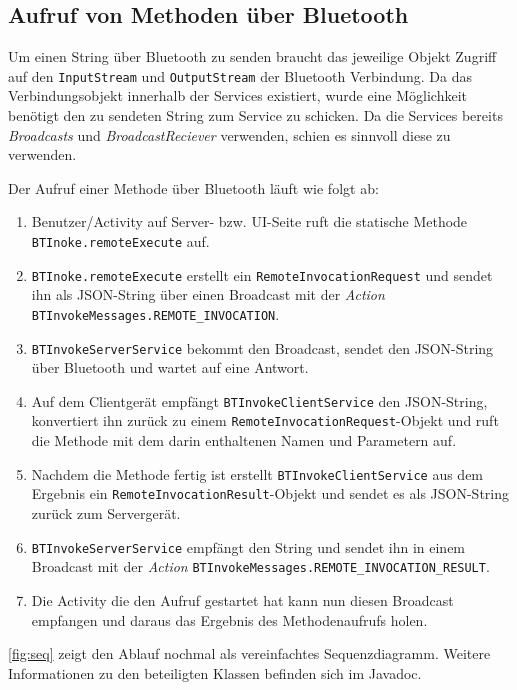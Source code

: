\subsection{Aufruf von Methoden über Bluetooth}
%
Um einen String über Bluetooth zu senden braucht das jeweilige Objekt Zugriff auf den \lstinline{InputStream} und \lstinline{OutputStream} der Bluetooth Verbindung. Da das Verbindungsobjekt innerhalb der Services existiert, wurde eine Möglichkeit benötigt den zu sendeten String zum Service zu schicken. Da die Services bereits \emph{Broadcasts} und \emph{BroadcastReciever} verwenden, schien es sinnvoll diese zu verwenden.

Der Aufruf einer Methode über Bluetooth läuft wie folgt ab:
\begin{enumerate}
  \item Benutzer/Activity auf Server- bzw. UI-Seite ruft die statische Methode \lstinline{BTInoke.remoteExecute} auf.
  \item \lstinline{BTInoke.remoteExecute} erstellt ein \lstinline{RemoteInvocationRequest} und sendet ihn als JSON-String über einen Broadcast mit der \emph{Action} \lstinline{BTInvokeMessages.REMOTE_INVOCATION}.
  \item \lstinline{BTInvokeServerService} bekommt den Broadcast, sendet den JSON-String über Bluetooth und wartet auf eine Antwort.
  \item Auf dem Clientgerät empfängt \lstinline{BTInvokeClientService} den JSON-String, konvertiert ihn zurück zu einem \lstinline{RemoteInvocationRequest}-Objekt und ruft die Methode mit dem darin enthaltenen Namen und Parametern auf.
  \item Nachdem die Methode fertig ist erstellt \lstinline{BTInvokeClientService} aus dem Ergebnis ein \lstinline{RemoteInvocationResult}-Objekt und sendet es als JSON-String zurück zum Servergerät.
  \item \lstinline{BTInvokeServerService} empfängt den String und sendet ihn in einem Broadcast mit der \emph{Action} \lstinline{BTInvokeMessages.REMOTE_INVOCATION_RESULT}.
  \item Die Activity die den Aufruf gestartet hat kann nun diesen Broadcast empfangen und daraus das Ergebnis des Methodenaufrufs holen.
\end{enumerate}
\autoref{fig:seq} zeigt den Ablauf nochmal als vereinfachtes Sequenzdiagramm. Weitere Informationen zu den beteiligten Klassen befinden sich im Javadoc.

